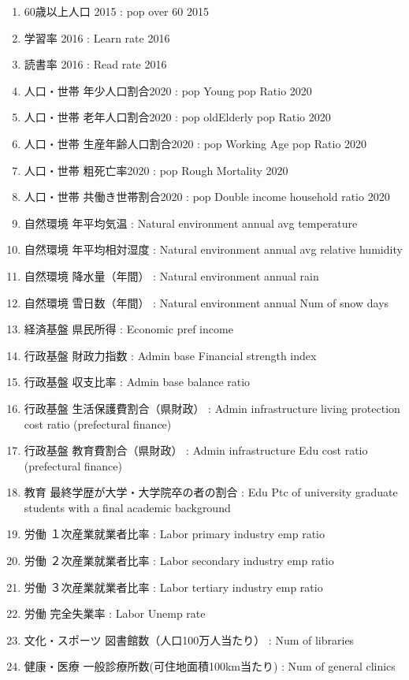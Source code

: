 \begin{multicols}{2}
\begin{enumerate}
  \item 60歳以上人口 2015  :  pop over 60 2015
  \item 学習率 2016  :  Learn rate 2016
  \item 読書率 2016  :  Read rate 2016
  \item 人口・世帯 年少人口割合2020  :  pop Young pop Ratio 2020
  \item 人口・世帯 老年人口割合2020  :  pop oldElderly pop Ratio 2020
  \item 人口・世帯 生産年齢人口割合2020  :  pop Working Age pop Ratio 2020
  \item 人口・世帯 粗死亡率2020  :  pop Rough Mortality 2020
  \item 人口・世帯 共働き世帯割合2020  :  pop Double income household ratio 2020
  \item 自然環境 年平均気温  :  Natural environment annual avg temperature
  \item 自然環境 年平均相対湿度  :  Natural environment annual avg relative humidity
  \item 自然環境 降水量（年間）  :  Natural environment annual rain
  \item 自然環境 雪日数（年間）  :  Natural environment annual Num of snow days
  \item 経済基盤 県民所得  :  Economic pref income
  \item 行政基盤 財政力指数  :  Admin base Financial strength index
  \item 行政基盤 収支比率  :  Admin base balance ratio
  \item 行政基盤 生活保護費割合（県財政）  :  Admin infrastructure living protection cost ratio (prefectural finance)
  \item 行政基盤 教育費割合（県財政）  :  Admin infrastructure Edu cost ratio (prefectural finance)
  \item 教育 最終学歴が大学・大学院卒の者の割合  :  Edu Ptc of university graduate students with a final academic background
  \item 労働 １次産業就業者比率  :  Labor primary industry emp ratio
  \item 労働 ２次産業就業者比率  :  Labor secondary industry emp ratio
  \item 労働 ３次産業就業者比率  :  Labor tertiary industry emp ratio
  \item 労働 完全失業率  :  Labor Unemp rate
  \item 文化・スポーツ 図書館数（人口100万人当たり）  :  Num of libraries
  \item 健康・医療 一般診療所数(可住地面積100km当たり)  :  Num of general clinics

\end{enumerate}
\end{multicols}

